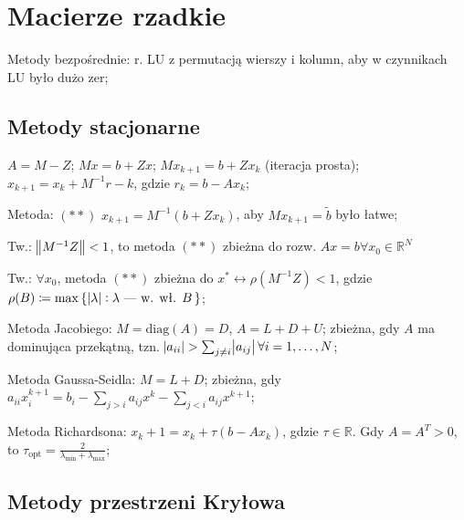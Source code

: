 \section{Macierze rzadkie}

\entry
Metody bezpośrednie:
r. LU z permutacją wierszy i kolumn, aby w czynnikach LU było dużo zer;


\subsection{Metody stacjonarne}

\entry
$A=M-Z$;
\entry
$Mx=b+Zx$;
\entry
$Mx_{k+1}=b+Zx_{k}$ (iteracja prosta);
\entry
$x_{k+1}=x_k+M^{-1}r-k$, gdzie $r_k=b-Ax_k$;

\entry
Metoda: $\mathrm{(**)}$ $x_{k+1}=M^{-1}(b+Zx_k)$,
aby $Mx_{k+1}=\tilde{b}$ było łatwe;

\entry
Tw.: $\norm{M^{-1}Z} < 1$,
to metoda $\mathrm{(**)}$ zbieżna do rozw. $Ax=b \forall x_0 \in \mathbb{R}^N$

\entry
Tw.: $\forall x_0$,
metoda $\mathrm{(**)}$
zbieżna do $x^* \leftrightarrow \rho(M^{-1}Z) < 1$,
gdzie $\rho(B) \coloneqq \max\set{\abs{\lambda} : \lambda\text{ --- w. wł. } B}$;


\entry
Metoda Jacobiego:
$M=\mathrm{diag}(A) = D$, $A=L+D+U$;
zbieżna, gdy $A$ ma dominująca przekątną,
tzn. $\abs{a_{ii}} > \sum_{j\neq i}\abs{a_{ij}} \forall i=1, \ldots, N$;

\entry
Metoda Gaussa-Seidla:
$M = L + D$;
zbieżna, gdy $a_{ii}x_i^{k+1}=b_i-\sum_{j>i}a_{ij}x^k-\sum_{j<i}a_{ij}x^{k+1}$;

\entry
Metoda Richardsona:
$x_k+1 = x_k + \tau(b-Ax_k)$, gdzie $\tau\in\mathbb{R}$.
Gdy $A=A^T>0$,
to $\tau_{\mathrm{opt}}=\frac{2}{\lambda_{\mathrm{min}} + \lambda_{\mathrm{max}} }$;

\subsection{Metody przestrzeni Kryłowa}


